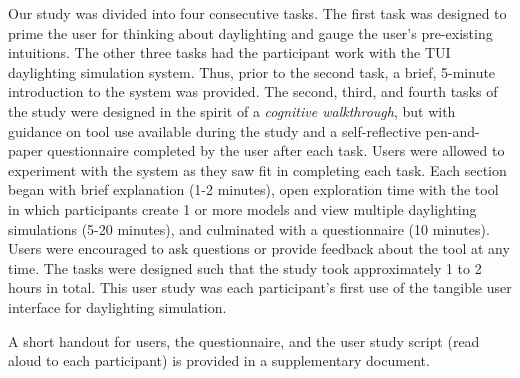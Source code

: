 Our study was divided into four consecutive tasks.  The first task was
designed to prime the user for thinking about daylighting and gauge
the user's pre-existing intuitions.  The other three tasks had the
participant work with the TUI daylighting simulation system.  Thus,
prior to the second task, a brief, 5-minute introduction to the system
was provided.  The second, third, and fourth tasks of the study were
designed in the spirit of a \emph{cognitive walkthrough}, but with
guidance on tool use available during the study and a self-reflective
pen-and-paper questionnaire completed by the user after each task.
Users were allowed to experiment with the system as they saw fit in
completing each task.
%
Each section began with brief explanation (1-2 minutes), open
exploration time with the tool in which participants create 1 or more
models and view multiple daylighting simulations (5-20 minutes), and
culminated with a questionnaire (10 minutes).  Users were encouraged
to ask questions or provide feedback about the tool at any time.  The
tasks were designed such that the study took approximately 1 to 2
hours in total.  This user study was each participant's first use
of the tangible user interface for daylighting simulation.

A short handout for users, the questionnaire, and the user study
script (read aloud to each participant) is provided in a supplementary
document.






%






